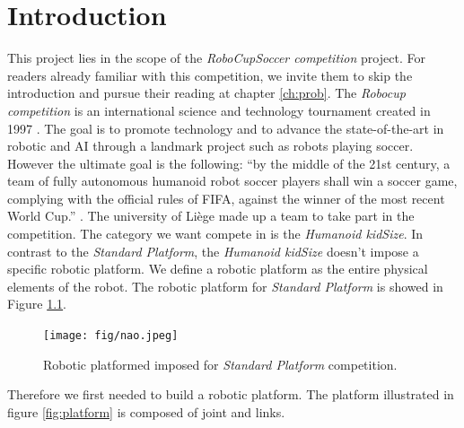 \documentclass[12pt,a4paper]{report}
\begin{document}
\chapter{Introduction}
\label{ch:intro}
This project lies in the scope of the \emph{RoboCupSoccer competition} project. For readers already familiar with this competition, we invite them to skip the introduction and pursue their reading at chapter \ref{ch:prob}.\newline
The \emph{Robocup competition} is an international science and technology tournament created in 1997 \cite{robocupHistory}. The goal is to promote technology and to advance the state-of-the-art in robotic and AI through a landmark project such as robots playing soccer. However the ultimate goal is the following: \newline ``by the middle of the 21st century, a team of fully autonomous humanoid robot soccer players shall win a soccer game, complying with the official rules of FIFA, against the winner of the most recent World Cup.'' \cite{RobocupObjective}.\newline
The university of Liège made up a team to take part in the competition. The category we want compete in is the \emph{Humanoid kidSize}. In contrast to the \emph{Standard Platform}, the \emph{Humanoid kidSize} doesn't impose a specific robotic platform. We define a robotic platform as the entire physical elements of the robot.\newline
The robotic platform for \emph{Standard Platform} is showed in Figure \ref{fig:nao}.
\begin{figure}
    \centering
    \texttt{[image: fig/nao.jpeg]}
    \caption{Robotic platformed imposed for \emph{Standard Platform} competition.}
    \label{fig:nao}
\end{figure}
Therefore we first needed to build a robotic platform. The platform illustrated in figure \ref{fig:platform} is composed of joint and links. 
\end{document}
